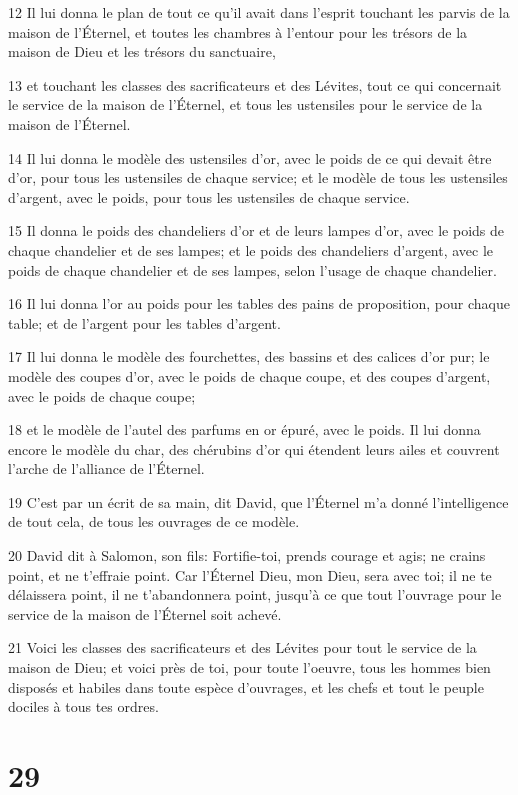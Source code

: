 \par 12 Il lui donna le plan de tout ce qu'il avait dans l'esprit touchant les parvis de la maison de l'Éternel, et toutes les chambres à l'entour pour les trésors de la maison de Dieu et les trésors du sanctuaire,
\par 13 et touchant les classes des sacrificateurs et des Lévites, tout ce qui concernait le service de la maison de l'Éternel, et tous les ustensiles pour le service de la maison de l'Éternel.
\par 14 Il lui donna le modèle des ustensiles d'or, avec le poids de ce qui devait être d'or, pour tous les ustensiles de chaque service; et le modèle de tous les ustensiles d'argent, avec le poids, pour tous les ustensiles de chaque service.
\par 15 Il donna le poids des chandeliers d'or et de leurs lampes d'or, avec le poids de chaque chandelier et de ses lampes; et le poids des chandeliers d'argent, avec le poids de chaque chandelier et de ses lampes, selon l'usage de chaque chandelier.
\par 16 Il lui donna l'or au poids pour les tables des pains de proposition, pour chaque table; et de l'argent pour les tables d'argent.
\par 17 Il lui donna le modèle des fourchettes, des bassins et des calices d'or pur; le modèle des coupes d'or, avec le poids de chaque coupe, et des coupes d'argent, avec le poids de chaque coupe;
\par 18 et le modèle de l'autel des parfums en or épuré, avec le poids. Il lui donna encore le modèle du char, des chérubins d'or qui étendent leurs ailes et couvrent l'arche de l'alliance de l'Éternel.
\par 19 C'est par un écrit de sa main, dit David, que l'Éternel m'a donné l'intelligence de tout cela, de tous les ouvrages de ce modèle.
\par 20 David dit à Salomon, son fils: Fortifie-toi, prends courage et agis; ne crains point, et ne t'effraie point. Car l'Éternel Dieu, mon Dieu, sera avec toi; il ne te délaissera point, il ne t'abandonnera point, jusqu'à ce que tout l'ouvrage pour le service de la maison de l'Éternel soit achevé.
\par 21 Voici les classes des sacrificateurs et des Lévites pour tout le service de la maison de Dieu; et voici près de toi, pour toute l'oeuvre, tous les hommes bien disposés et habiles dans toute espèce d'ouvrages, et les chefs et tout le peuple dociles à tous tes ordres.

\chapter{29}

